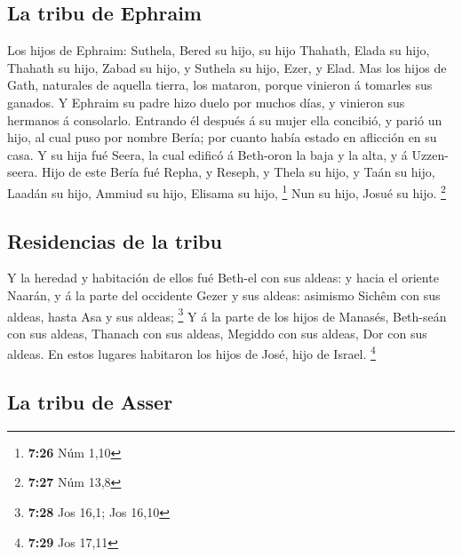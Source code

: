 \hypertarget{la-tribu-de-ephraim}{%
\subsection{La tribu de Ephraim}\label{la-tribu-de-ephraim}}

 Los hijos de Ephraim: Suthela, Bered su hijo, su hijo
Thahath, Elada su hijo, Thahath su hijo,  Zabad su hijo,
y Suthela su hijo, Ezer, y Elad. Mas los hijos de Gath, naturales de
aquella tierra, los mataron, porque vinieron á tomarles sus ganados.
 Y Ephraim su padre hizo duelo por muchos días, y
vinieron sus hermanos á consolarlo.  Entrando él después
á su mujer ella concibió, y parió un hijo, al cual puso por nombre
Bería; por cuanto había estado en aflicción en su casa. 
Y su hija fué Seera, la cual edificó á Beth-oron la baja y la alta, y á
Uzzen-seera.  Hijo de este Bería fué Repha, y Reseph, y
Thela su hijo, y Taán su hijo,  Laadán su hijo, Ammiud su
hijo, Elisama su hijo, \footnote{\textbf{7:26} Núm 1,10} 
Nun su hijo, Josué su hijo. \footnote{\textbf{7:27} Núm 13,8}

\hypertarget{residencias-de-la-tribu}{%
\subsection{Residencias de la tribu}\label{residencias-de-la-tribu}}

 Y la heredad y habitación de ellos fué Beth-el con sus
aldeas: y hacia el oriente Naarán, y á la parte del occidente Gezer y
sus aldeas: asimismo Sichêm con sus aldeas, hasta Asa y sus aldeas;
\footnote{\textbf{7:28} Jos 16,1; Jos 16,10}  Y á la
parte de los hijos de Manasés, Beth-seán con sus aldeas, Thanach con sus
aldeas, Megiddo con sus aldeas, Dor con sus aldeas. En estos lugares
habitaron los hijos de José, hijo de Israel. \footnote{\textbf{7:29} Jos
  17,11}

\hypertarget{la-tribu-de-asser}{%
\subsection{La tribu de Asser}\label{la-tribu-de-asser}}

